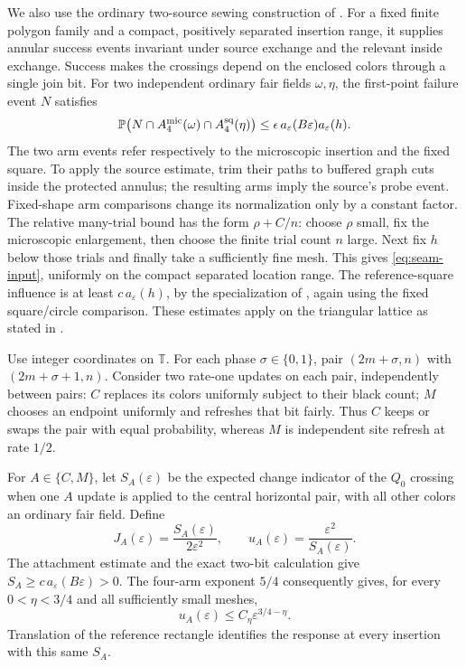\documentclass[11pt]{article}
\newcommand{\Pp}{\mathbb P}
\newcommand{\T}{\mathbb T}
\begin{document}
We also use the ordinary two-source sewing construction of
\cite[Section 6, Lemmas 6.5--6.6 and the relative many-trial estimate]{OAI}.
For a fixed finite polygon family and a compact, positively separated
insertion range, it supplies annular success events invariant under
source exchange and the relevant inside exchange. Success makes the
crossings depend on the enclosed colors through a single join bit.
For two independent ordinary fair fields $\omega,\eta$, the first-point
failure event $N$ satisfies
\begin{equation}\label{eq:seam-input}
 \Pp\bigl(N\cap A_4^{\rm mic}(\omega)\cap A_4^{\rm sq}(\eta)\bigr)
       \leq\epsilon\,a_\varepsilon(B\varepsilon)a_\varepsilon(h).
\end{equation}
The two arm events refer respectively to the microscopic insertion and
the fixed square. To apply the source estimate, trim their paths to
buffered graph cuts inside the protected annulus; the resulting arms
imply the source's probe event. Fixed-shape arm comparisons change its
normalization only by a constant factor. The relative many-trial bound
has the form $\rho+C/n$: choose $\rho$ small, fix the microscopic
enlargement, then choose the finite trial count $n$ large. Next fix $h$
below those trials and finally take a sufficiently fine mesh. This gives
\eqref{eq:seam-input}, uniformly on the compact separated location range.
The reference-square influence is at least
$c\,a_\varepsilon(h)$, by the specialization of
\cite[Lemma 6.1]{OAI}, again using the fixed square/circle comparison.
These estimates apply on the
triangular lattice as stated in \cite[Sections 2 and 6]{OAI}.

Use integer coordinates on $\T$. For each phase $\sigma\in\{0,1\}$,
pair $(2m+\sigma,n)$ with $(2m+\sigma+1,n)$. Consider two rate-one
updates on each pair, independently between pairs:
$C$ replaces its colors uniformly subject to their black count;
$M$ chooses an endpoint uniformly and refreshes that bit fairly.
Thus $C$ keeps or swaps the pair with equal probability, whereas $M$
is independent site refresh at rate $1/2$.

For $A\in\{C,M\}$, let $S_A(\varepsilon)$ be the expected change
indicator of the $Q_0$ crossing when one $A$ update is applied to the
central horizontal pair, with all other colors an ordinary fair field.
Define
\begin{equation}\label{eq:clock}
 J_A(\varepsilon)=\frac{S_A(\varepsilon)}{2\varepsilon^2},
 \qquad u_A(\varepsilon)=\frac{\varepsilon^2}{S_A(\varepsilon)}.
\end{equation}
The attachment estimate and the exact two-bit calculation give
$S_A\geq c\,a_\varepsilon(B\varepsilon)>0$. The four-arm exponent
$5/4$ \cite[Theorem 4]{SW} consequently gives, for every
$0<\eta<3/4$ and all sufficiently small meshes,
\begin{equation}\label{eq:clock-bound}
       u_A(\varepsilon)\leq C_\eta\varepsilon^{3/4-\eta}.
\end{equation}
Translation of the reference rectangle identifies the response
at every insertion with this same $S_A$.
\end{document}
